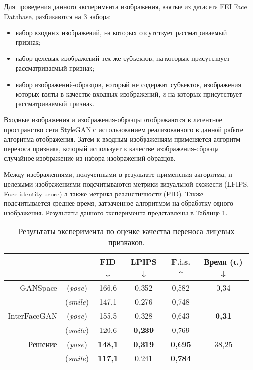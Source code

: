 Для проведения данного эксперимента изображения, взятые из датасета FEI Face Database, разбиваются на 3 набора:
\begin{itemize}

\item набор входных изображений, на которых отсутствует рассматриваемый признак;
\item набор целевых изображений тех же субъектов, на которых присутствует рассматриваемый признак; 
\item набор изображений-образцов, который не содержит субъектов, изображения которых взяты в качестве входных изображений, и на которых присутствует рассматриваемый признак.
\end{itemize}
Входные изображения и изображения-образцы отображаются в латентное пространство сети StyleGAN с использованием реализованного в данной работе алгоритма отображения.
Затем к входным изображениям применяется алгоритм переноса признака, который использует в качестве изображения-образца случайное изображение из набора изображений-образцов.

Между изображениями, полученными в результате применения алгоритма, и целевыми изображениями подсчитываются метрики визуальной схожести (LPIPS, Face identity score) а также метрика реалистичности (FID).
Также подсчитывается среднее время, затраченное алгоритмом на обработку одного изображения.
Результаты данного эксперимента представлены в Таблице \ref{tab:exp2}.

\begin{table}
\begin{center}
  \caption{Результаты эксперимента по оценке качества переноса лицевых признаков.}
  \label{tab:exp2}
  \begin{tabular}{ |r c|c|c|c|c| } 
    \hline
      & & FID ↓ & LPIPS ↓ & F.i.s. ↑ & Время (с.) ↓ \\ 
    \hline\hline
    GANSpace & (\emph{pose}) & 166,6 & 0,352 & 0,582 & 0,34 \\
            & (\emph{smile}) & 147,1 & 0,276 & 0,748 &  \\
    \hline
    InterFaceGAN 
             & (\emph{pose}) & 155,5 & 0,328 & 0,643 & \textbf{0,31} \\
            & (\emph{smile}) & 120,6 & \textbf{0,239} & 0,769 & \\
    \hline
    Решение  & (\emph{pose}) & \textbf{148,1} & \textbf{0,319} & \textbf{0,695} & 38,25 \\ 
            & (\emph{smile}) & \textbf{117,1} & 0.241 & \textbf{0,784} &  \\ 
    \hline
  \end{tabular}
\end{center}
\end{table}

